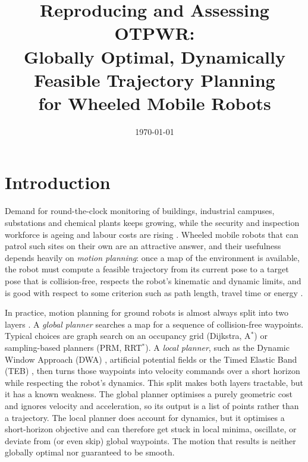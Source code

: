 \documentclass[11pt,a4paper]{article}
\title{Reproducing and Assessing OTPWR:\\
Globally Optimal, Dynamically Feasible Trajectory Planning\\
for Wheeled Mobile Robots}
\author{}
\date{\today}
\begin{document}
\maketitle

\section{Introduction}
\label{sec:intro}

Demand for round-the-clock monitoring of buildings, industrial campuses,
substations and chemical plants keeps growing, while the security and
inspection workforce is ageing and labour costs are rising
\citep{luo2024otpwr,gao2018patrol}. Wheeled mobile robots that can patrol
such sites on their own are an attractive answer, and their usefulness
depends heavily on \emph{motion planning}: once a map of the environment is
available, the robot must compute a feasible trajectory from its current pose
to a target pose that is collision-free, respects the robot's kinematic and
dynamic limits, and is good with respect to some criterion such as path
length, travel time or energy
\citep{lavalle2006planning,siegwart2011introduction}.

In practice, motion planning for ground robots is almost always split into
two layers \citep{marder2010office,paden2016survey}. A \emph{global planner}
searches a map for a sequence of collision-free waypoints. Typical choices
are graph search on an occupancy grid (Dijkstra, A$^\ast$) or sampling-based
planners (PRM, RRT$^\ast$). A \emph{local planner}, such as the Dynamic Window
Approach (DWA) \citep{fox1997dwa}, artificial potential fields
\citep{khatib1986realtime} or the Timed Elastic Band (TEB)
\citep{rosmann2012teb}, then turns those waypoints into velocity commands
over a short horizon while respecting the robot's dynamics. This split makes
both layers tractable, but it has a known weakness. The global planner
optimises a purely geometric cost and ignores velocity and acceleration, so
its output is a list of points rather than a trajectory. The local planner
does account for dynamics, but it optimises a short-horizon objective and can
therefore get stuck in local minima, oscillate, or deviate from (or even skip)
global waypoints. The motion that results is neither globally optimal nor
guaranteed to be smooth.

\end{document}
